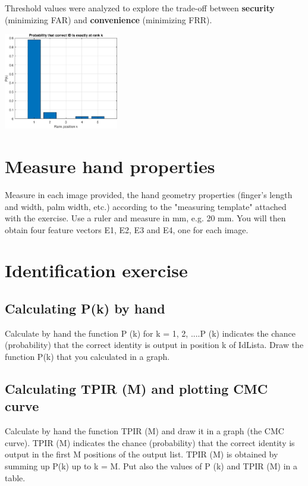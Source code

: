 \documentclass[a4paper,12pt]{article}
\begin{document}
\vspace{0.3em}
\noindent
Threshold values were analyzed to explore the trade-off between \textbf{security} (minimizing FAR) and \textbf{convenience} (minimizing FRR).

\vspace{0.4cm} %
\centering
\includegraphics[width=5cm]{Resources/rank_plot.eps} \\[0.5cm]

\newpage
\section{Measure hand properties}
Measure in each image provided, the hand geometry properties (finger’s length and width, palm width, etc.) according to the "measuring template" attached with the exercise. Use a ruler and measure in mm, e.g. 20 mm. You will then obtain four feature vectors E1, E2, E3 and E4, one for each image.


\section{Identification exercise}

\subsection{Calculating P(k) by hand}
Calculate by hand the function P (k) for k = 1, 2, ....P (k) indicates the chance (probability) that the correct identity is output in position k of IdLista. Draw the function P(k) that you calculated in a graph.

\subsection{Calculating TPIR (M) and plotting CMC curve}
Calculate by hand the function TPIR (M) and draw it in a graph (the CMC curve). 
TPIR (M) indicates the chance (probability) that the correct identity is output in the first M positions of the output list.  TPIR (M) is obtained by summing up P(k) up to k = M.
Put also the values of P (k) and TPIR (M) in a table.
\end{document}
